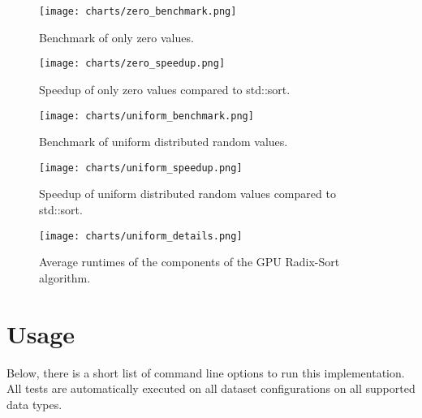 \documentclass{llncs}
\begin{document}
\begin{figure}
  \begin{center}
    \texttt{[image: charts/zero\_benchmark.png]}
  \end{center}
  \caption{Benchmark of only zero values.}\label{fig:zero_bench}
\end{figure}

\begin{figure}
  \begin{center}
    \texttt{[image: charts/zero\_speedup.png]}
  \end{center}
  \caption{Speedup of only zero values compared to std::sort.}\label{fig:zero_speedup}
\end{figure}

\begin{figure}
  \begin{center}
    \texttt{[image: charts/uniform\_benchmark.png]}
  \end{center}
  \caption{Benchmark of uniform distributed random values.}\label{fig:uniform_bench}
\end{figure}

\begin{figure}
  \begin{center}
    \texttt{[image: charts/uniform\_speedup.png]}
  \end{center}
  \caption{Speedup of uniform distributed random values compared to std::sort.}\label{fig:uniform_speedup}
\end{figure}

\begin{figure}
  \begin{center}
    \texttt{[image: charts/uniform\_details.png]}
  \end{center}
  \caption{Average runtimes of the components of the GPU Radix-Sort algorithm.}\label{fig:components}
\end{figure}

\section{Usage}
Below, there is a short list of command line options to run this implementation. All tests are automatically executed on all dataset configurations on all supported data types.
\end{document}
